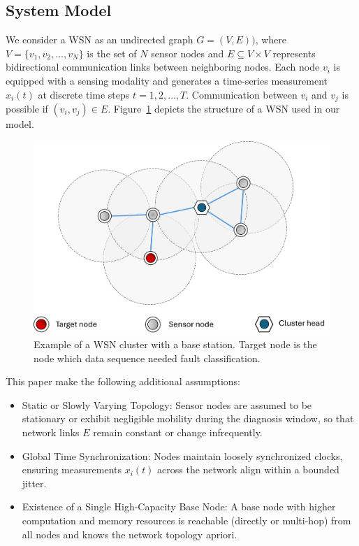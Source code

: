 \subsection{System Model}
We consider a WSN as an undirected graph \(G=(V,E))\), where \(V=\{v_1, v_2, \ldots, v_N\}\) is the set of \(N\) sensor nodes and \(E \subseteq V \times V\) represents bidirectional communication links between neighboring nodes. Each node \(v_i\) is equipped with a sensing modality and generates a time-series measurement \(x_i(t)\) at discrete time steps \(t=1, 2, \ldots, T\). Communication between \(v_i\) and \(v_j\) is possible if \((v_i,v_j) \in E\). Figure~\ref{fig:wsn} depicts the structure of a WSN used in our model.

\begin{figure}
\centering
\includegraphics[width=0.8\linewidth]{images/WSN.png}
\caption{Example of a WSN cluster with a base station. Target node is the node which data sequence needed fault classification.}
\label{fig:wsn}
\end{figure}

This paper make the following additional assumptions:
\begin{itemize}
\item Static or Slowly Varying Topology: Sensor nodes are assumed to be stationary or exhibit negligible mobility during the diagnosis window, so that network links \(E\) remain constant or change infrequently.
\item Global Time Synchronization: Nodes maintain loosely synchronized clocks, ensuring measurements \(x_i(t)\) across the network align within a bounded jitter.
\item Existence of a Single High-Capacity Base Node: A base node with higher computation and memory resources is reachable (directly or multi-hop) from all nodes and knows the network topology apriori.
\end{itemize}

